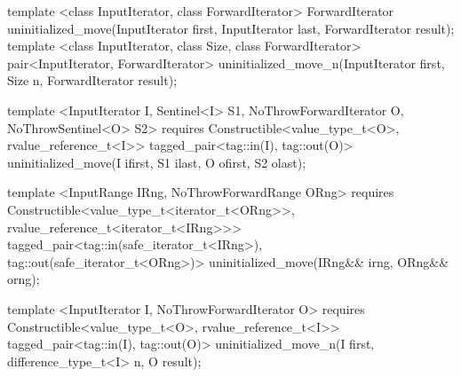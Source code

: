 {\color{remclr}
\begin{codeblock}
template <class InputIterator, class ForwardIterator>
  ForwardIterator uninitialized_move(InputIterator first, InputIterator last,
                                     ForwardIterator result);
template <class InputIterator, class Size, class ForwardIterator>
  pair<InputIterator, ForwardIterator>
    uninitialized_move_n(InputIterator first, Size n, ForwardIterator result);
\end{codeblock}
} %
{\color{addclr}
\begin{codeblock}
template <InputIterator I, Sentinel<I> S1, NoThrowForwardIterator O, NoThrowSentinel<O> S2>
requires
  Constructible<value_type_t<O>, rvalue_reference_t<I>>
tagged_pair<tag::in(I), tag::out(O)>
  uninitialized_move(I ifirst, S1 ilast, O ofirst, S2 olast);

template <InputRange IRng, NoThrowForwardRange ORng>
  requires
Constructible<value_type_t<iterator_t<ORng>>, rvalue_reference_t<iterator_t<IRng>>>
  tagged_pair<tag::in(safe_iterator_t<IRng>), tag::out(safe_iterator_t<ORng>)>
uninitialized_move(IRng&& irng, ORng&& orng);

template <InputIterator I, NoThrowForwardIterator O>
  requires
Constructible<value_type_t<O>, rvalue_reference_t<I>>
  tagged_pair<tag::in(I), tag::out(O)>
uninitialized_move_n(I first, difference_type_t<I> n, O result);
\end{codeblock}
} %

